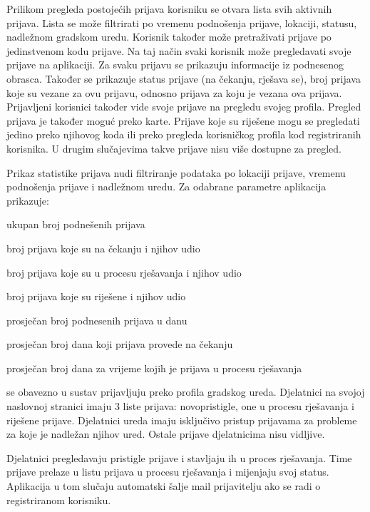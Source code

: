 		Prilikom pregleda postojećih prijava korisniku se otvara lista svih aktivnih prijava. Lista se može filtrirati po vremenu podnošenja prijave, lokaciji, statusu, nadležnom gradskom uredu. Korisnik također može pretraživati prijave po jedinstvenom kodu prijave. Na taj način svaki korisnik može pregledavati svoje prijave na aplikaciji. Za svaku prijavu se prikazuju informacije iz podnesenog obrasca. Također se prikazuje status prijave (na čekanju, rješava se), broj prijava koje su vezane za ovu prijavu, odnosno prijava za koju je vezana ova prijava. Prijavljeni korisnici također vide svoje prijave na pregledu svojeg profila. Pregled prijava je također moguć preko karte. Prijave koje su riješene mogu se pregledati jedino preko njihovog koda ili preko pregleda korisničkog profila kod registriranih korisnika. U drugim slučajevima takve prijave nisu više dostupne za pregled.
		
		Prikaz statistike prijava nudi filtriranje podataka po lokaciji prijave, vremenu podnošenja prijave i nadležnom uredu. Za odabrane parametre aplikacija prikazuje:
		\begin{packed_item}
			\item ukupan broj podnešenih prijava
			\item broj prijava koje su na čekanju i njihov udio
			\item broj prijava koje su u procesu rješavanja i njihov udio
			\item broj prijava koje su riješene i njihov udio
			\item prosječan broj podnesenih prijava u danu
			\item prosječan broj dana koji prijava provede na čekanju
			\item prosječan broj dana za vrijeme kojih je prijava u procesu rješavanja
		\end{packed_item}
		
		 se obavezno u sustav prijavljuju preko profila gradskog ureda. Djelatnici na svojoj naslovnoj stranici imaju 3 liste prijava: novopristigle, one u procesu rješavanja i riješene prijave. Djelatnici ureda imaju isključivo pristup prijavama za probleme za koje je nadležan njihov ured. Ostale prijave djelatnicima nisu vidljive.
		
		Djelatnici pregledavaju pristigle prijave i stavljaju ih u proces rješavanja. Time prijave prelaze u listu prijava u procesu rješavanja i mijenjaju svoj status. Aplikacija u tom slučaju automatski šalje mail prijavitelju ako se radi o registriranom korisniku.
		
